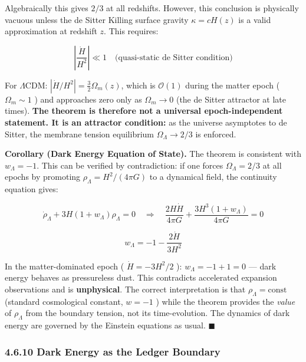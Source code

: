 \documentclass[11pt,a4paper]{article}
\theoremstyle{definition}\newtheorem{definition}{Definition}
\theoremstyle{remark}\newtheorem{remark}{Remark}
\begin{document}
Algebraically this gives $2/3$ at all redshifts. However, this conclusion is physically vacuous unless the de Sitter Killing surface gravity $\kappa = cH(z)$ is a valid approximation at redshift $z$. This requires:


\begin{equation}
\left|\frac{\dot{H}}{H^2}\right| \ll 1 \quad \text{(quasi-static de Sitter condition)}
\end{equation}


For $\Lambda$CDM: $|\dot{H}/H^2| = \frac{3}{2}\Omega_m(z)$, which is $\mathcal{O}(1)$ during the matter epoch ( $\Omega_m \sim 1$ ) and approaches zero only as $\Omega_m \to 0$ (the de Sitter attractor at late times). \textbf{The theorem is therefore not a universal epoch-independent statement. It is an attractor condition:} as the universe asymptotes to de Sitter, the membrane tension equilibrium $\Omega_\Lambda \to 2/3$ is enforced.

\textbf{Corollary (Dark Energy Equation of State).} The theorem is consistent with $w_\Lambda = -1$. This can be verified by contradiction: if one forces $\Omega_\Lambda = 2/3$ at all epochs by promoting $\rho_\Lambda = H^2/(4\pi G)$ to a dynamical field, the continuity equation gives:


\begin{equation}
\dot{\rho}_\Lambda + 3H(1+w_\Lambda)\rho_\Lambda = 0 \quad \Longrightarrow \quad \frac{2H\dot{H}}{4\pi G} + \frac{3H^3(1+w_\Lambda)}{4\pi G} = 0
\end{equation}



\begin{equation}
w_\Lambda = -1 - \frac{2\dot{H}}{3H^2}
\end{equation}


In the matter-dominated epoch ( $\dot{H} = -3H^2/2$ ): $w_\Lambda = -1 + 1 = 0$ — dark energy behaves as pressureless dust. This contradicts accelerated expansion observations and is \textbf{unphysical}. The correct interpretation is that $\rho_\Lambda = \text{const}$ (standard cosmological constant, $w = -1$ ) while the theorem provides the \textit{value} of $\rho_\Lambda$ from the boundary tension, not its time-evolution. The dynamics of dark energy are governed by the Einstein equations as usual. $\blacksquare$
\subsubsection{4.6.10 Dark Energy as the Ledger Boundary}
\end{document}
